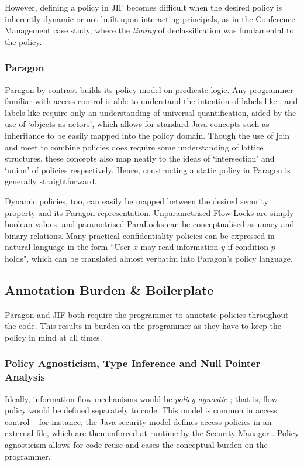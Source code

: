 However, defining a policy in JIF becomes difficult when the desired policy is inherently dynamic or not built upon interacting principals, as in the Conference Management case study, where the \textit{timing} of declassification was fundamental to the policy.

\subsubsection{Paragon}

Paragon by contrast builds its policy model on predicate logic. Any programmer familiar with access control is able to understand the intention of labels like , and labels like  require only an understanding of universal quantification, aided by the use of `objects as actors', which allows for standard Java concepts such as inheritance to be easily mapped into the policy domain. Though the use of join and meet to combine policies does require some understanding of lattice structures, these concepts also map neatly to the ideas of `intersection' and `union' of policies respectively. Hence, constructing a static policy in Paragon is generally straightforward.

Dynamic policies, too, can easily be mapped between the desired security property and its Paragon representation. Unparametrised Flow Locks are simply boolean values, and parametrised ParaLocks can be conceptualised as unary and binary relations. Many practical confidentiality policies can be expressed in natural language in the form ``User $ x $ may read information $ y $ if condition $ p $ holds", which can be translated almost verbatim into Paragon's policy language.

\subsection{Annotation Burden \& Boilerplate}

Paragon and JIF both require the programmer to annotate policies throughout the code. This results in burden on the programmer as they have to keep the policy in mind at all times.

\subsubsection{Policy Agnosticism, Type Inference and Null Pointer Analysis}

Ideally, information flow mechanisms would be \textit{policy agnostic} \cite{yang2012agnostic}\cite{austin2013agnostic}; that is, flow policy would be defined separately to code. This model is common in access control -- for instance, the Java security model defines access policies in an external file, which are then enforced at runtime by the Security Manager \cite{gong2003javasecurity}. Policy agnosticism allows for code reuse and eases the conceptual burden on the programmer.

